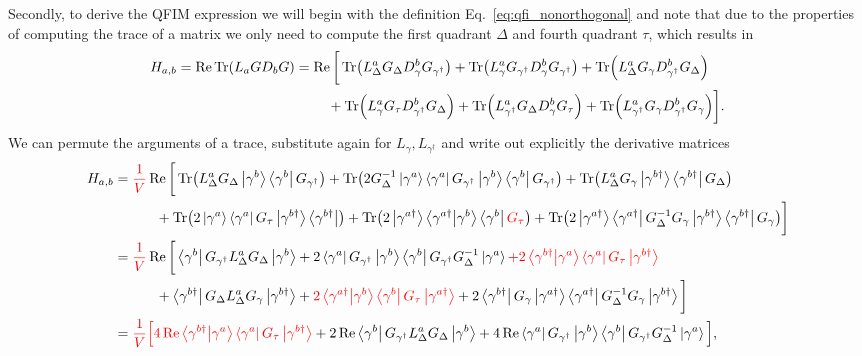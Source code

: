 \documentclass[reprint,amsmath,amssymb,aps,prl,floatfix,groupedaddress,superscriptaddress]{revtex4-2}
\begin{document}
Secondly, to derive the QFIM expression we will begin with the definition Eq.~\eqref{eq:qfi_nonorthogonal} and note that due to the properties of computing the trace of a matrix we only need to compute the first quadrant $\Delta$ and fourth quadrant $\tau$, which results in
\begin{align}
    H_{a,b} = \Re \Tr (L_a G D_b G) &= \Re \bigg[\Tr (L^a_\Delta G_\Delta D^b_\gamma G_{\gamma^\dagger}) + \Tr (L^a_\gamma G_{\gamma^\dagger} D^b_\gamma G_{\gamma^\dagger}) + \Tr (L^a_{\Delta} G_{\gamma} D^b_{\gamma^\dagger} G_\Delta) \nonumber \\ &\quad\quad\ +
    \Tr (L^a_{\gamma} G_\tau D^b_{\gamma^\dagger} G_\Delta)
    + \Tr (L^a_{\gamma^\dagger} G_\Delta D^b_{\gamma} G_\tau)
    + \Tr (L^a_{\gamma^\dagger} G_{\gamma} D^b_{\gamma^\dagger} G_{\gamma}) \bigg].
\end{align}
We can permute the arguments of a trace, substitute again for $L_\gamma, L_{\gamma^\dagger}$ and write out explicitly the derivative matrices
\begin{align}
    H_{a,b} &= {\color{red} \frac{1}{V} } \Re \bigg[
     \Tr (L^a_\Delta G_\Delta \ket{\gamma^b}\bra{\gamma^b} G_{\gamma^\dagger})
    +  \Tr (2 G^{-1}_\Delta\ket{\gamma^{a}}\bra{\gamma^{a}} G_{\gamma^\dagger} \ket{\gamma^b}\bra{\gamma^b} G_{\gamma^\dagger})
    +  \Tr (L^a_{\Delta} G_{\gamma} \ket{\gamma^{b\dagger}}\bra{\gamma^{b\dagger}} G_\Delta) \nonumber  \\
    &\quad\qquad + \Tr (2 \ket{\gamma^a}\bra{\gamma^a} G_\tau \ket{\gamma^{b\dagger}}\bra{\gamma^{b\dagger}})
    +  \Tr (2\ket{\gamma^{a\dagger}}\bra{\gamma^{a\dagger}} \ket{\gamma^b}\bra{\gamma^b} {\color{red} G_\tau })
    +  \Tr (2\ket{\gamma^{a\dagger}}\bra{\gamma^{a\dagger}}G^{-1}_\Delta G_{\gamma} \ket{\gamma^{b\dagger}}\bra{\gamma^{b\dagger}} G_{\gamma})
 \bigg] \nonumber \\
    &= {\color{red} \frac{1}{V} } \Re \bigg[
    \bra{\gamma^b} G_{\gamma^\dagger} L^a_\Delta G_\Delta\ket{\gamma^b}
    +  2 \bra{\gamma^{a}}G_{\gamma^\dagger}\ket{\gamma^b} \bra{\gamma^b} G_{\gamma^\dagger} G^{-1}_\Delta  \ket{\gamma^{a}}
    {\color{red} + 2 \braket{\gamma^{b\dagger}}{\gamma^a} \bra{\gamma^a} G_\tau \ket{\gamma^{b\dagger}}}
\nonumber    \\ & \quad\qquad+  \bra{\gamma^{b\dagger}} G_\Delta L^a_{\Delta} G_{\gamma} \ket{\gamma^{b\dagger}}
    + {\color{red}2 \braket{\gamma^{a\dagger}}{\gamma^b} \bra{\gamma^b} G_\tau \ket{\gamma^{a\dagger}}}
    + 2\bra{\gamma^{b\dagger}} G_{\gamma} \ket{\gamma^{a\dagger}}\bra{\gamma^{a\dagger}}G^{-1}_\Delta G_{\gamma}\ket{\gamma^{b\dagger}} \bigg]\nonumber \\
    &= {\color{red} \frac{1}{V} \Big[ 4 \Re \braket{\gamma^{b\dagger}}{\gamma^a} \bra{\gamma^a} G_\tau \ket{\gamma^{b\dagger}} } + 2\Re \bra{\gamma^b} G_{\gamma^\dagger} L^a_\Delta G_\Delta \ket{\gamma^b}
    + 4 \Re \bra{\gamma^a}G_{\gamma^\dagger}\ket{\gamma^b}\bra{\gamma^b}G_{\gamma^\dagger} G^{-1}_\Delta\ket{\gamma^a} \Big],
\end{align}
\end{document}
